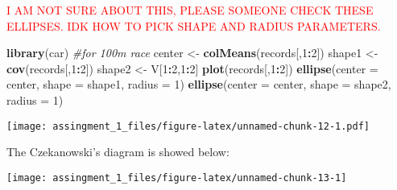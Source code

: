 \documentclass[]{article}
\newenvironment{Shaded}{\begin{snugshade}}{\end{snugshade}}
\newcommand{\CommentTok}[1]{\textcolor[rgb]{0.56,0.35,0.01}{\textit{#1}}}
\newcommand{\DataTypeTok}[1]{\textcolor[rgb]{0.13,0.29,0.53}{#1}}
\newcommand{\DecValTok}[1]{\textcolor[rgb]{0.00,0.00,0.81}{#1}}
\newcommand{\KeywordTok}[1]{\textcolor[rgb]{0.13,0.29,0.53}{\textbf{#1}}}
\newcommand{\NormalTok}[1]{#1}
\newcommand{\OperatorTok}[1]{\textcolor[rgb]{0.81,0.36,0.00}{\textbf{#1}}}
\newcommand{\StringTok}[1]{\textcolor[rgb]{0.31,0.60,0.02}{#1}}
\begin{document}
\textcolor{red}{I AM NOT SURE ABOUT THIS, PLEASE SOMEONE CHECK THESE ELLIPSES. IDK HOW TO PICK SHAPE AND RADIUS PARAMETERS.}

\begin{Shaded}
\begin{Highlighting}[]
\KeywordTok{library}\NormalTok{(car)}
\CommentTok{#for 100m race}
\NormalTok{center <-}\StringTok{ }\KeywordTok{colMeans}\NormalTok{(records[,}\DecValTok{1}\OperatorTok{:}\DecValTok{2}\NormalTok{])}
\NormalTok{shape1 <-}\StringTok{ }\KeywordTok{cov}\NormalTok{(records[,}\DecValTok{1}\OperatorTok{:}\DecValTok{2}\NormalTok{])}
\NormalTok{shape2 <-}\StringTok{ }\NormalTok{V[}\DecValTok{1}\OperatorTok{:}\DecValTok{2}\NormalTok{,}\DecValTok{1}\OperatorTok{:}\DecValTok{2}\NormalTok{]}
\KeywordTok{plot}\NormalTok{(records[,}\DecValTok{1}\OperatorTok{:}\DecValTok{2}\NormalTok{])}
\KeywordTok{ellipse}\NormalTok{(}\DataTypeTok{center =}\NormalTok{ center, }\DataTypeTok{shape =}\NormalTok{ shape1, }\DataTypeTok{radius =} \DecValTok{1}\NormalTok{)}
\KeywordTok{ellipse}\NormalTok{(}\DataTypeTok{center =}\NormalTok{ center, }\DataTypeTok{shape =}\NormalTok{ shape2, }\DataTypeTok{radius =} \DecValTok{1}\NormalTok{)}
\end{Highlighting}
\end{Shaded}

\texttt{[image: assingment\_1\_files/figure-latex/unnamed-chunk-12-1.pdf]}

The Czekanowski's diagram is showed below:

\begin{center}\texttt{[image: assingment\_1\_files/figure-latex/unnamed-chunk-13-1]} \end{center}
\end{document}
